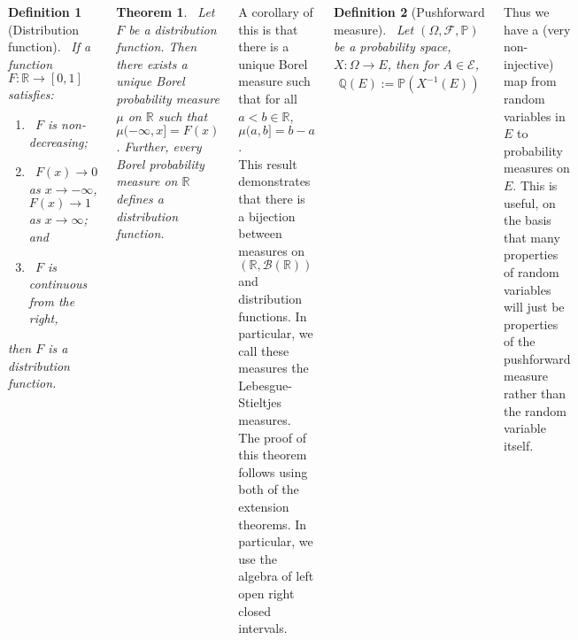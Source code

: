 \documentclass{tikzposter} %
\newcommand\leftopen[2]{\ensuremath{(#1,#2]}}
\newtheorem{theorem}{Theorem}
\newtheorem{definition}{Definition}
\begin{document}
\begin{columns}
{    \begin{definition}[Distribution function]
    \ If a function $F : \mathbb{R} \to [0,1]$ satisfies:
    \begin{enumerate}[label=\roman*.]
          \item \ $F$ is non-decreasing;
          \item \ $F(x) \to 0$ as $x \to -\infty$, $F(x) \to 1$ as $x \to \infty$; and
            \item \ $F$ is continuous from the right,
    \end{enumerate}
    then $F$ is a distribution function.
    \end{definition}
    \hphantom{}

    \begin{theorem}
    \ Let $F$ be a distribution function. Then there exists a unique Borel probability measure $\mu$ on $\mathbb{R}$ such that $\mu\leftopen{-\infty}{x} = F(x)$. Further, every Borel probability measure on $\mathbb{R}$ defines a distribution function.
    \end{theorem}
    \hphantom{}

    A corollary of this is that there is a unique Borel measure such that for all $a < b \in \mathbb{R}$, $\mu\leftopen{a}{b} = b-a$. \\

    This result demonstrates that there is a bijection between measures on $(\mathbb{R}, \mathcal{B}(\mathbb{R}))$ and distribution functions. In particular, we call these measures the Lebesgue-Stieltjes measures. \\

    The proof of this theorem follows using both of the extension theorems. In particular, we use the algebra of left open right closed intervals. \\

    \begin{definition}[Pushforward measure]
      \ Let $(\Omega, \mathcal{F}, \mathbb{P})$ be a probability space, $X : \Omega \to E$, then for $A \in \mathcal{E}$,
      \begin{align*}
        \mathbb{Q}(E) := \mathbb{P}(X^{-1}(E))
      \end{align*}
    \end{definition}
    \hphantom{}

    Thus we have a (very non-injective) map from random variables in $E$ to probability measures on $E$. This is useful, on the basis that many properties of random variables will just be properties of the pushforward measure rather than the random variable itself. \\

}
\end{columns}
\end{document}
